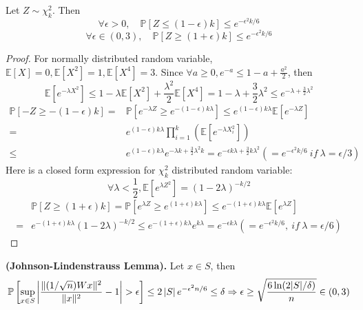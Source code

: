 \begin{lemma}
    Let $ Z \sim \chi^2_k $. Then
    \[
        \forall \epsilon > 0, \quad \mathbb{P}\left[ Z \le (1-\epsilon) k \right] \le e^{-\epsilon^2 k/6}
    \]
    \[
        \forall \epsilon \in (0,3), \quad \mathbb{P}\left[ Z \ge (1+\epsilon) k \right] \le e^{-\epsilon^2 k/6}
    \]
    \begin{proof}
        For normally distributed random variable, $ \mathbb{E}[X] = 0, \mathbb{E}[X^2] = 1, \mathbb{E} [X^4] = 3 $.
        Since $ \forall a \ge 0,  e^{-a} \le 1 - a + \frac{a^2}{2} $, then
        \[
            \mathbb{E}\left[ e^{-\lambda X^2} \right] \le 1 - \lambda \mathbb{E}\left[ X^2 \right] + \frac{\lambda^2}{2} \mathbb{E}\left[ X^4 \right] = 1 - \lambda + \frac{3}{2}\lambda^2 \le e^{-\lambda + \frac{3}{2} \lambda^2}
        \]
        \begin{align*}
            \mathbb{P}\left[ -Z \ge -(1 - \epsilon) k \right] =& \mathbb{P} \left[ e^{-\lambda Z} \ge e^{-(1-\epsilon) k \lambda} \right] \le e^{(1 - \epsilon) k \lambda} \mathbb{E} \left[ e^{-\lambda Z} \right]\\
            =& e^{(1 - \epsilon) k \lambda} \prod_{i=1}^{k}\left( \mathbb{E} \left[ e^{-\lambda X^2_i} \right] \right)\\
            \le& e^{(1 - \epsilon) k \lambda} e^{-\lambda k + \frac{3}{2} \lambda^2 k} = e^{-\epsilon k\lambda + \frac{3}{2} k \lambda^2} (=  e^{-\epsilon^2 k/6}\ if\ \lambda = \epsilon/3)
        \end{align*}
        Here is a closed form expression for $ \chi^2_k $ distributed random variable:
        \[
            \forall \lambda < \frac{1}{2}, \mathbb{E}\left[ e^{\lambda Z^2} \right] =  {(1 - 2\lambda)}^{-k/2}
        \]
        \begin{align*}
            &\mathbb{P} \left[ Z \ge (1 + \epsilon) k \right] = \mathbb{P} \left[ e^{\lambda Z} \ge e^{(1+\epsilon) k \lambda} \right] \le e^{-(1+\epsilon)k\lambda}\mathbb{E}\left[ e^{\lambda Z} \right]\\
            =& e^{-(1+\epsilon)k\lambda} {(1 - 2\lambda)}^{-k/2} \le e^{-(1+\epsilon)k\lambda}e^{k\lambda} = e^{-\epsilon k \lambda} ( = e^{-\epsilon^2 k / 6}, \ if\ \lambda = \epsilon/6)
        \end{align*}
    \end{proof}
\end{lemma}

\begin{lemma}
    \textbf{(Johnson-Lindenstrauss Lemma).}
    Let $ x \in S $, then
    \[
        \mathbb{P}\left[ \sup_{x \in S} \left| \frac{ \Arrowvert (1/\sqrt n)W x \Arrowvert^2 }{ \Arrowvert x \Arrowvert^2 } - 1 \right| > \epsilon \right] \le 2 \left| S \right| e^{-\epsilon^2 n / 6} \le \delta \Rightarrow 
        \epsilon \ge \sqrt{ \frac{6 \ln(2 |S| /\delta )}{n} } \in (0, 3)
    \]
\end{lemma}

